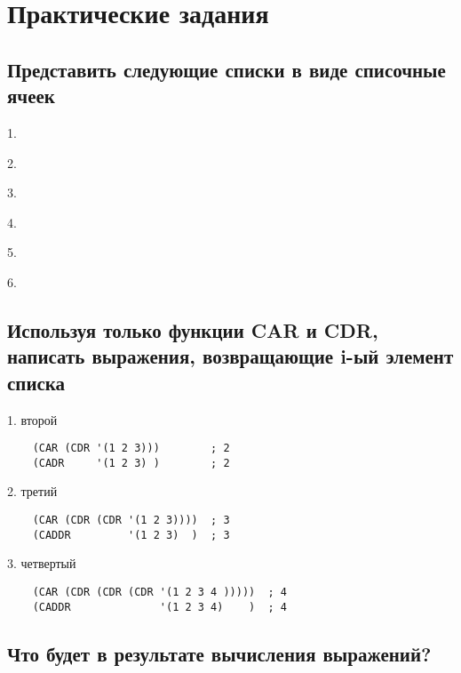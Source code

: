 \chapter{Практические задания}

\section{Представить следующие списки в виде списочные ячеек}

1. 


2. 


3. 


\newpage

4. 


5. 


6. 


\section{Используя только функции CAR и CDR, написать выражения,
возвращающие i-ый элемент списка}

1. второй
\begin{lstlisting}
    (CAR (CDR '(1 2 3)))        ; 2
    (CADR     '(1 2 3) )        ; 2
\end{lstlisting}

2. третий
\begin{lstlisting}
    (CAR (CDR (CDR '(1 2 3))))  ; 3
    (CADDR         '(1 2 3)  )  ; 3
\end{lstlisting}

3. четвертый
\begin{lstlisting}
    (CAR (CDR (CDR (CDR '(1 2 3 4 )))))  ; 4
    (CADDR              '(1 2 3 4)    )  ; 4
\end{lstlisting}

\section{Что будет в результате вычисления выражений?}

